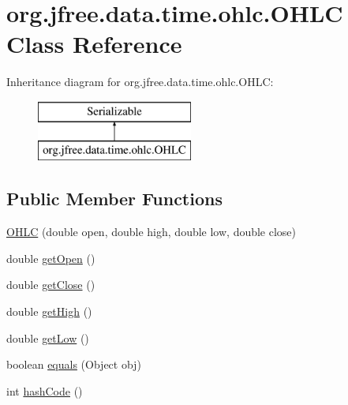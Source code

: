 \hypertarget{classorg_1_1jfree_1_1data_1_1time_1_1ohlc_1_1_o_h_l_c}{}\section{org.\+jfree.\+data.\+time.\+ohlc.\+O\+H\+LC Class Reference}
\label{classorg_1_1jfree_1_1data_1_1time_1_1ohlc_1_1_o_h_l_c}
Inheritance diagram for org.\+jfree.\+data.\+time.\+ohlc.\+O\+H\+LC\+:\begin{figure}[H]
\begin{center}
\leavevmode
\includegraphics[height=2.000000cm]{classorg_1_1jfree_1_1data_1_1time_1_1ohlc_1_1_o_h_l_c}
\end{center}
\end{figure}
\subsection*{Public Member Functions}
\begin{DoxyCompactItemize}
\item 
\mbox{\hyperlink{classorg_1_1jfree_1_1data_1_1time_1_1ohlc_1_1_o_h_l_c_a3f34f99b6e2623e71b6ea09d8a33b88f}{O\+H\+LC}} (double open, double high, double low, double close)
\item 
double \mbox{\hyperlink{classorg_1_1jfree_1_1data_1_1time_1_1ohlc_1_1_o_h_l_c_aea2c3cf6c5687f5249aa85077bf0b52d}{get\+Open}} ()
\item 
double \mbox{\hyperlink{classorg_1_1jfree_1_1data_1_1time_1_1ohlc_1_1_o_h_l_c_a9f45337b16c4eb6b68481ca85cf81445}{get\+Close}} ()
\item 
double \mbox{\hyperlink{classorg_1_1jfree_1_1data_1_1time_1_1ohlc_1_1_o_h_l_c_a422f29590c94b7122da1ee25c903edbd}{get\+High}} ()
\item 
double \mbox{\hyperlink{classorg_1_1jfree_1_1data_1_1time_1_1ohlc_1_1_o_h_l_c_aafd8ef7cce6f621060ed7232873b8ada}{get\+Low}} ()
\item 
boolean \mbox{\hyperlink{classorg_1_1jfree_1_1data_1_1time_1_1ohlc_1_1_o_h_l_c_a44e9a639fce02f40d00a22b83f9c7379}{equals}} (Object obj)
\item 
int \mbox{\hyperlink{classorg_1_1jfree_1_1data_1_1time_1_1ohlc_1_1_o_h_l_c_aa7b39c1dcc3ac1162c87d271d3d4a231}{hash\+Code}} ()
\end{DoxyCompactItemize}


